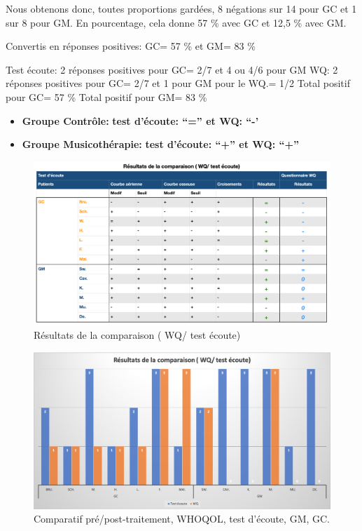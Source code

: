 Nous obtenons donc, toutes proportions gardées, 8 négations sur 14 pour GC et
1 sur 8 pour GM. En pourcentage, cela donne 57  \% avec GC et 12,5  \% avec GM.

Convertis en réponses positives: GC= 57 \%   et GM= 83  \%


Test écoute: 2 réponses positives pour GC= 2/7  et        4  ou 4/6 pour GM 
WQ:               2 réponses positives pour GC= 2/7 et 1 pour GM pour le WQ.= 1/2
Total positif pour GC= 57 \%
 Total positif pour GM= 83  \%
 \begin{itemize} 
 \item \textbf{Groupe Contrôle:} 	          \textbf{ test d'écoute: ``=''   et    WQ: ``-'}


 \item \textbf{Groupe Musicothérapie:}     \textbf{test d'écoute: ``+''      et    WQ: ``+''}
  \end{itemize}
  \begin{figure}
  	\centering
  	\includegraphics[width=\linewidth]{images/graphiques/comparaison_pre_post.png}
  	\caption[Résultats de la comparaison ( WQ/ test écoute)]{Résultats de la comparaison ( WQ/ test 
  	écoute)}
  	
  \end{figure}
  \begin{figure}
  	\centering
  	\includegraphics[width=\linewidth]{images/graphiques/comparatifWQecoute.png}
  	\caption[Comparatif résultats pré/post]{Comparatif
  		pré/post-traitement, WHOQOL, test d'écoute, GM, GC.}
  	
  \end{figure}
  
